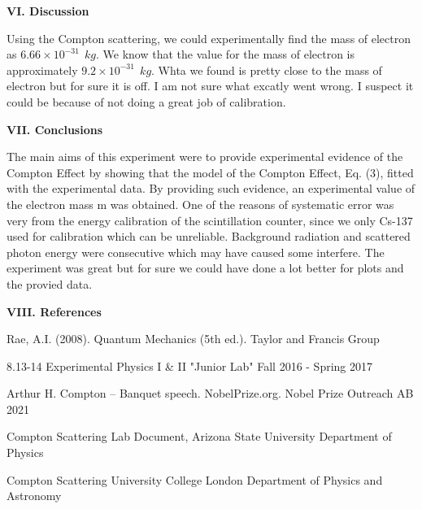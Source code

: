 \documentclass[fleqn]{article}
\begin{document}
  \pagebreak

  \textbf{VI. Discussion}

  \vspace{10px}

  Using the Compton scattering, we could experimentally find the mass of electron as $6.66 \times 10^{-31} ~~ kg$. We know that
  the value for the mass of electron is approximately $9.2 \times 10^{-31} ~~ kg$. Whta we found is pretty close to the mass of electron
  but for sure it is off. I am not sure what excatly went wrong. I suspect it could be because of not doing a great job of calibration.   

  \vspace{30px}

  \textbf{VII. Conclusions}

  \vspace{10px}

  The main aims of this experiment were to provide experimental evidence of the Compton Effect by showing that the model of the Compton Effect,
  Eq. (3), fitted with the experimental data. By providing such evidence, an experimental value of the electron mass m was obtained.
  One of the reasons of systematic error was very from the energy calibration of the scintillation counter, since we 
  only Cs-137 used for calibration which can be unreliable. Background radiation and scattered photon energy were consecutive
  which may have caused some interfere. The experiment was great but for sure we could have done a lot better for plots and the provied data.  

  \vspace{30px}

  \textbf{VIII. References}

  \vspace{15px}

  Rae, A.I. (2008). Quantum Mechanics (5th ed.). Taylor and Francis Group

  \vspace{5px}

  8.13-14 Experimental Physics I \& II "Junior Lab" Fall 2016 - Spring 2017

  \vspace{5px}

  Arthur H. Compton – Banquet speech. NobelPrize.org. Nobel Prize Outreach AB 2021

  \vspace{5px}

  Compton Scattering Lab Document, Arizona State University Department of Physics

  \vspace{5px}

  Compton Scattering University College London Department of Physics and Astronomy
\end{document}
